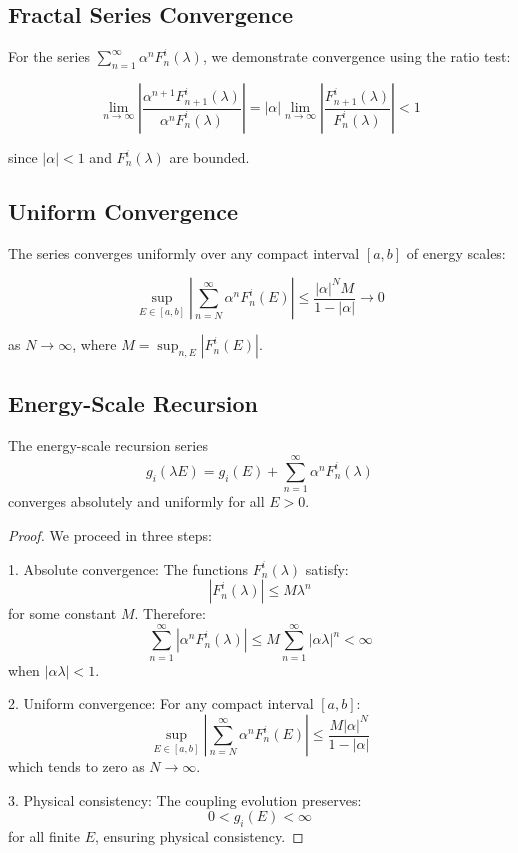 \documentclass{article}
\begin{document}
\subsection{Fractal Series Convergence}

For the series $\sum_{n=1}^{\infty} \alpha^n F_n^i(\lambda)$, we demonstrate convergence using the ratio test:

\begin{equation}
\lim_{n \to \infty} \left|\frac{\alpha^{n+1} F_{n+1}^i(\lambda)}{\alpha^n F_n^i(\lambda)}\right| = |\alpha| \lim_{n \to \infty} \left|\frac{F_{n+1}^i(\lambda)}{F_n^i(\lambda)}\right| < 1
\end{equation}

since $|\alpha| < 1$ and $F_n^i(\lambda)$ are bounded.

\subsection{Uniform Convergence}

The series converges uniformly over any compact interval $[a,b]$ of energy scales:

\begin{equation}
\sup_{E \in [a,b]} \left|\sum_{n=N}^{\infty} \alpha^n F_n^i(E)\right| \leq \frac{|\alpha|^N M}{1-|\alpha|} \to 0
\end{equation}

as $N \to \infty$, where $M = \sup_{n,E} |F_n^i(E)|$.

\subsection{Energy-Scale Recursion}

\begin{theorem}
The energy-scale recursion series
\[
g_i(\lambda E) = g_i(E) + \sum_{n=1}^{\infty} \alpha^n F_n^i(\lambda)
\]
converges absolutely and uniformly for all $E > 0$.
\end{theorem}

\begin{proof}
We proceed in three steps:

1. Absolute convergence:
   The functions $F_n^i(\lambda)$ satisfy:
   \[
   |F_n^i(\lambda)| \leq M\lambda^n
   \]
   for some constant $M$. Therefore:
   \[
   \sum_{n=1}^{\infty} |\alpha^n F_n^i(\lambda)| \leq M\sum_{n=1}^{\infty} |\alpha\lambda|^n < \infty
   \]
   when $|\alpha\lambda| < 1$.

2. Uniform convergence:
   For any compact interval $[a,b]$:
   \[
   \sup_{E \in [a,b]} \left|\sum_{n=N}^{\infty} \alpha^n F_n^i(E)\right| \leq \frac{M|\alpha|^N}{1-|\alpha|}
   \]
   which tends to zero as $N \to \infty$.

3. Physical consistency:
   The coupling evolution preserves:
   \[
   0 < g_i(E) < \infty
   \]
   for all finite $E$, ensuring physical consistency.
\end{proof}
\end{document}
